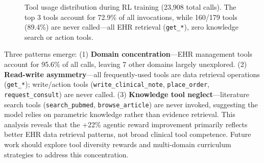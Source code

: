 \documentclass{article}
\begin{document}
\begin{figure}[h]
\centering
{}
\caption{Tool usage distribution during RL training (23,908 total calls). The top 3 tools account for 72.9\% of all invocations, while 160/179 tools (89.4\%) are never called---all EHR retrieval (\texttt{get\_*}), zero knowledge search or action tools.}
\label{fig:tool_usage}
\end{figure}

Three patterns emerge: (1) \textbf{Domain concentration}---EHR management tools account for 95.6\% of all calls, leaving 7 other domains largely unexplored. (2) \textbf{Read-write asymmetry}---all frequently-used tools are data retrieval operations (\texttt{get\_*}); write/action tools (\texttt{write\_clinical\_note}, \texttt{place\_order}, \texttt{request\_consult}) are never called. (3) \textbf{Knowledge tool neglect}---literature search tools (\texttt{search\_pubmed}, \texttt{browse\_article}) are never invoked, suggesting the model relies on parametric knowledge rather than evidence retrieval. This analysis reveals that the +22\% agentic reward improvement primarily reflects better EHR data retrieval patterns, not broad clinical tool competence. Future work should explore tool diversity rewards and multi-domain curriculum strategies to address this concentration.
\end{document}
